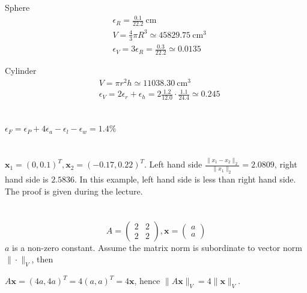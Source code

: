 \documentclass{article}
\begin{document}
\section{}
Sphere
\begin{align*}
	 & \epsilon_R = \frac{0.1}{22.2} ~\mathrm{cm}                 \\
	 & V = \frac{4}{3} \pi R^3 \simeq 45829.75 ~\mathrm{cm}^3     \\
	 & \epsilon_V = 3 \epsilon_R = \frac{0.3}{22.2} \simeq 0.0135
\end{align*}

Cylinder
\begin{align*}
	 & V = \pi r^2 h \simeq 11038.30 ~\mathrm{cm}^3                                                   \\
	 & \epsilon_V = 2\epsilon_r + \epsilon_h = 2 \frac{1.2}{12.0} \cdot \frac{1.1}{24.4} \simeq 0.245
\end{align*}

\section{}
$\epsilon_F = \epsilon_P + 4\epsilon_a - \epsilon_l - \epsilon_w = 1.4 \%$

\section{}
$\boldsymbol{x}_1 = (0, 0.1)^T, \boldsymbol{x}_2 = (-0.17,
	0.22)^T$.
Left hand side $\frac{\|x_1 - x_2\|_2}{\|x_1\|_2} = 2.0809$, right hand side is
$2.5836$. In this example, left hand side is less than right hand
side. The proof is given during the lecture.

\section{}
\begin{equation*}
	A =
	\begin{pmatrix}
		2 & 2 \\
		2 & 2
	\end{pmatrix}
	, \boldsymbol{x} =
	\begin{pmatrix}
		a \\
		a
	\end{pmatrix}
\end{equation*}
$a$ is a non-zero constant. Assume the matrix norm is
subordinate to vector norm $\|\cdot\|_V$, then

$A \boldsymbol{x} = (4a, 4a)^T = 4 (a, a)^T = 4 \boldsymbol{x}$,
hence $\|A\boldsymbol{x}\|_V = 4 \|\boldsymbol{x}\|_V$.
\end{document}
